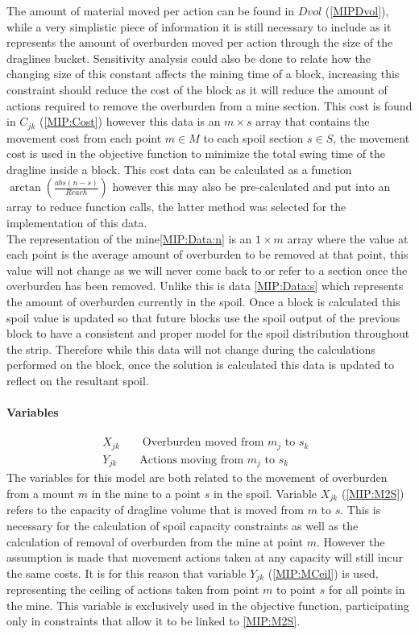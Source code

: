 The amount of material moved per action can be found in $Dvol$ (\ref{MIPDvol}), while a very simplistic piece of information it is still necessary to include as it represents the amount of overburden moved per action through the size of the draglines bucket. Sensitivity analysis could also be done to relate how the changing size of this constant affects the mining time of a block, increasing this constraint should reduce the cost of the block as it will reduce the amount of actions required to remove the overburden from a mine section. This cost is found in $C_{jk}$ (\ref{MIP:Cost}) however this data is an $m\times s$ array that contains the movement cost from each point $m\in M$ to each spoil section $s \in S$, the movement cost is used in the objective function to minimize the total swing time of the dragline inside a block. This cost data can be calculated as a function $\arctan(\frac{abs(n-s)}{Reach})$ however this may also be pre-calculated and put into an array to reduce function calls, the latter method was selected for the implementation of this data. 
\\
The representation of the mine\ref{MIP:Data:n} is an $1\times m$ array where the value at each point is the average amount of overburden to be removed at that point, this value will not change as we will never come back to or refer to a section once the overburden has been removed. Unlike this is data \ref{MIP:Data:s} which represents the amount of overburden currently in the spoil. Once a block is calculated this spoil value is updated so that future blocks use the spoil output of the previous block to have a consistent and proper model for the spoil distribution throughout the strip. Therefore while this data will not change during the calculations performed on the block, once the solution is calculated this data is updated to reflect on the resultant spoil. 
\paragraph*{Variables}
\begin{align}
\label{MIP:M2S}
X_{jk} \qquad \text{Overburden moved from $m_{j}$ to $s_k$ }\\
\label{MIP:MCeil}
Y_{jk} \qquad \text{Actions moving from $m_{j}$ to $s_k$ }
\end{align}
The variables for this model are both related to the movement of overburden from a mount $m$ in the mine to a point $s$ in the spoil. Variable $X_{jk}$ (\ref{MIP:M2S}) refers to the capacity of dragline volume that is moved from $m$ to $s$. This is necessary for the calculation of spoil capacity constraints as well as the calculation of removal of overburden from the mine at point $m$. However the assumption is made that movement actions taken at any capacity will still incur the same costs. It is for this reason that variable $Y_{jk}$ (\ref{MIP:MCeil}) is used, representing the ceiling of actions taken from point $m$ to point $s$ for all points in the mine. This variable is exclusively used in the objective function, participating only in constraints that allow it to be linked to \ref{MIP:M2S}.
